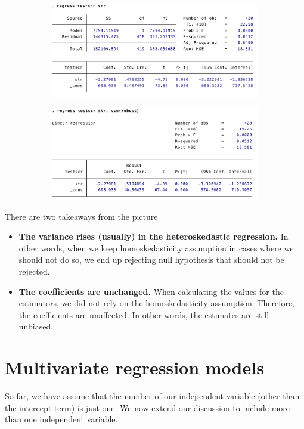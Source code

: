 \documentclass[12pt]{article}
\theoremstyle{definition}
\theoremstyle{property}
\theoremstyle{assumption}
\theoremstyle{example}
\theoremstyle{comment}
\begin{document}
\begin{figure}
\centering
\begin{subfigure}[H]{0.475\textwidth}
\includegraphics[width=\textwidth]{nonrobust.png}
\end{subfigure}
\begin{subfigure}[H]{0.475\textwidth}
\includegraphics[width=\textwidth]{robust.png}
\end{subfigure}
\end{figure}
There are two takeaways from the picture
\begin{itemize}
\item \textbf{The variance rises (usually) in the heteroskedastic regression.} In other words, when we keep homoskedasticity assumption in cases where we should not do so, we end up rejecting null hypothesis that should not be rejected.
\item \textbf{The coefficients are unchanged.} When calculating the values for the estimators, we did not rely on the homoskedasticity assumption. Therefore, the coefficients are unaffected. In other words, the estimates are still unbiased.
\end{itemize}

\section{Multivariate regression models}
So far, we have assume that the number of our independent variable (other than the intercept term) is just one. We now extend our discussion to include more than one independent variable. 
\end{document}
